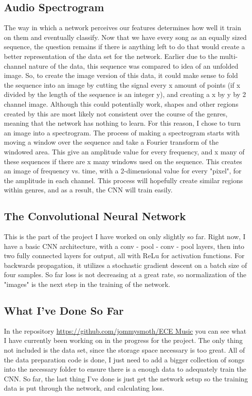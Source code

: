\documentclass{article}
\begin{document}
\subsection{Audio Spectrogram}
The way in which a network perceives our features determines how well it train on them and eventually classify. Now that we have every song as an equally sized sequence, the question remains if there is anything left to do that would create a better representation of the data set for the network. Earlier due to the multi-channel nature of the data, this sequence was compared to idea of an unfolded image. So, to create the image version of this data, it could make sense to fold the sequence into an image by cutting the signal every x amount of points (if x divided by the length of the sequence is an integer y), and creating a x by y by 2 channel image. Although this could potentially work, shapes and other regions created by this are most likely not consistent over the course of the genres, meaning that the network has nothing to learn. For this reason, I chose to turn an image into a spectrogram. The process of making a spectrogram starts with moving a window over the sequence and take a Fourier transform of the windowed area. This give an amplitude value for every frequency, and x many of these sequences if there are x many windows used on the sequence. This creates an image of frequency vs. time, with a 2-dimensional value for every "pixel", for the amplitude in each channel. This process will hopefully create similar regions within genres, and as a result, the CNN will train easily. 
\subsection{The Convolutional Neural Network}
This is the part of the project I have worked on only slightly so far. Right now, I have a basic CNN architecture, with a conv - pool - conv - pool layers, then into two fully connected layers for output, all with ReLu for activation functions. For backwards propagation, it utilizes a stochastic gradient descent on a batch size of four samples. So far loss is not decreasing at a great rate, so normalization of the "images" is the next step in the training of the network. 
\subsection{What I've Done So Far}
In the repository \href{https://github.com/jommysmoth/ECE_Music}{https://github.com/jommysmoth/ECE Music} you can see what I have currently been working on in the progress for the project. The only thing not included is the data set, since the storage space necessary is too great. All of the data preparation code is done, I just need to add a bigger collection of songs into the necessary folder to ensure there is a enough data to adequately train the CNN. So far, the last thing I've done is just get the network setup so the training data is put through the network, and calculating loss.
\end{document}

